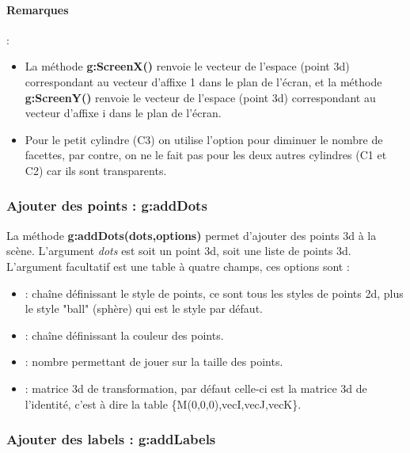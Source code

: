 \paragraph{Remarques} : 
\begin{itemize}
    \item La méthode \textbf{g:ScreenX()} renvoie le vecteur de l'espace (point 3d) correspondant au vecteur d'affixe 1 dans le plan de l'écran, et la méthode \textbf{g:ScreenY()} renvoie le vecteur de l'espace (point 3d) correspondant au vecteur d'affixe i dans le plan de l'écran.
    \item Pour le petit cylindre (C3) on utilise l'option  pour diminuer le nombre de facettes, par contre, on ne le fait pas pour les deux autres cylindres (C1 et C2) car ils sont transparents.
\end{itemize}

\subsubsection{Ajouter des points : g:addDots}

La méthode \textbf{g:addDots(dots,options)} permet d'ajouter des points 3d à la scène. L'argument \emph{dots} est soit un point 3d, soit une liste de points 3d. L'argument facultatif  est une table à quatre champs, ces options sont :
\begin{itemize}
        \item {} : chaîne définissant le style de points, ce sont tous les styles de points 2d, plus le style "ball" (sphère) qui est le style par défaut. 
    \item {} : chaîne définissant la couleur des points.
    \item {} : nombre permettant de jouer sur la taille des points.
    \item {} : matrice 3d de transformation, par défaut celle-ci est la matrice 3d de l'identité, c'est à dire la table \{M(0,0,0),vecI,vecJ,vecK\}.
\end{itemize}

\subsubsection{Ajouter des labels : g:addLabels}

